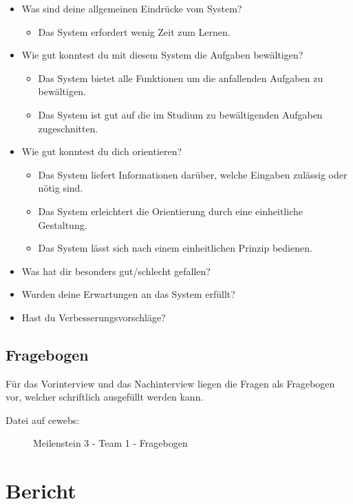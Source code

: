 \documentclass[a4paper,10pt]{scrartcl}
\begin{document}
\begin{itemize}

 \item Was sind deine allgemeinen Eindrücke vom System?
 \begin{itemize}
    \item Das System erfordert wenig Zeit zum Lernen.
 \end{itemize}
 \item Wie gut konntest du mit diesem System die Aufgaben bewältigen?
 \begin{itemize}
    \item Das System bietet alle Funktionen um die anfallenden Aufgaben zu bewältigen.
    \item Das System ist gut auf die im Studium zu bewältigenden Aufgaben zugeschnitten.
 \end{itemize}
 \item Wie gut konntest du dich orientieren?
 \begin{itemize}
    \item Das System liefert Informationen darüber, welche Eingaben zulässig oder nötig sind.
    \item Das System erleichtert die Orientierung durch eine einheitliche Gestaltung.
    \item Das System lässt sich nach einem einheitlichen Prinzip bedienen.
 \end{itemize}
 \item Was hat dir besonders gut/schlecht gefallen?
 \item Wurden deine Erwartungen an das System erfüllt?
 \item Hast du Verbesserungsvorschläge?
\end{itemize}

\subsection{Fragebogen}

Für das Vorinterview und das Nachinterview liegen die Fragen als Fragebogen vor, welcher schriftlich ausgefüllt werden kann.

\begin{description}
 \item[Datei auf cewebs:]Meilenstein 3 - Team 1 - Fragebogen
\end{description}

\section{Bericht}
\end{document}
